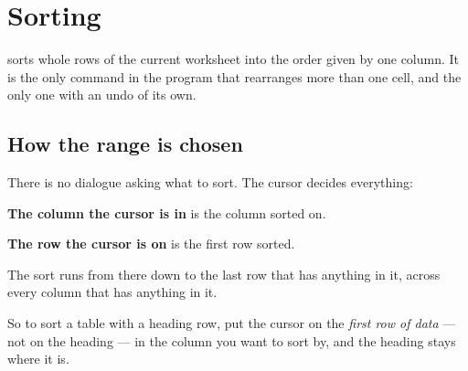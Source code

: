 \chapter{Sorting}
\label{ch:sorting}

\ccprod{} sorts whole rows of the current worksheet into the order given by one
column. It is the only command in the program that rearranges more than one
cell, and the only one with an undo of its own.

\section{How the range is chosen}

There is no dialogue asking what to sort. The cursor decides everything:

\begin{ccsteps}
\item \textbf{The column the cursor is in} is the column sorted on.
\item \textbf{The row the cursor is on} is the first row sorted.
\item The sort runs from there down to the last row that has anything in it,
across every column that has anything in it.
\end{ccsteps}

So to sort a table with a heading row, put the cursor on the \emph{first row of
data} --- not on the heading --- in the column you want to sort by, and the
heading stays where it is.

